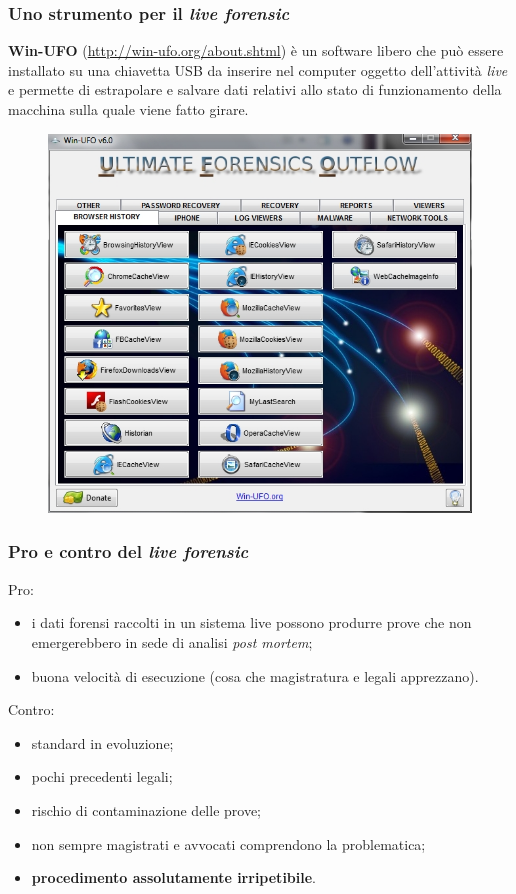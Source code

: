 \documentclass[11pt]{beamer}
\begin{document}
	\begin{frame}[shrink]
			\frametitle{Uno strumento per il \textit{live forensic}}			
			\textbf{Win-UFO} (\url{http://win-ufo.org/about.shtml}) è un software libero che può essere installato su una chiavetta USB da inserire nel computer oggetto dell'attività \textit{live} e permette di estrapolare e salvare dati relativi allo stato di funzionamento della macchina sulla quale viene fatto girare.
			
			\begin{figure}
				\centering
				\includegraphics[width=.4\linewidth]{pics/winufo1}
						
			\end{figure}

			
	\end{frame}
	
	\begin{frame}
		\frametitle{Pro e contro del \textit{live forensic}}
	Pro:
	\begin{itemize}
		\item i dati forensi raccolti in un sistema live possono produrre prove che non emergerebbero in sede di analisi \textit{post mortem};
		\item buona velocità di esecuzione (cosa che magistratura e legali apprezzano).
	\end{itemize}
	\vfill
	Contro:
	\begin{itemize}
		\item standard in evoluzione;
		\item pochi precedenti legali;
		\item rischio di contaminazione delle prove;
		\item non sempre magistrati e avvocati comprendono la problematica;
		\item \textbf{procedimento assolutamente irripetibile}.
	\end{itemize}

	\end{frame}
	
\end{document}

